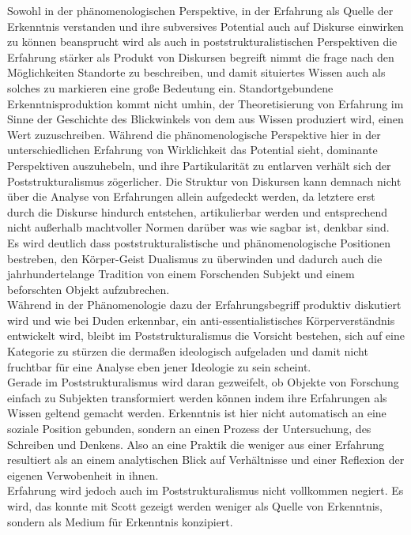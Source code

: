 Sowohl in der phänomenologischen Perspektive, in der Erfahrung als Quelle der
Erkenntnis verstanden und ihre subversives Potential auch auf Diskurse
einwirken zu können beansprucht wird \footnotemark {} als auch in poststrukturalistischen
Perspektiven die Erfahrung stärker als Produkt von Diskursen begreift
\footnotemark {} nimmt
die frage nach den Möglichkeiten Standorte zu beschreiben, und damit situiertes
Wissen auch als solches zu markieren eine große Bedeutung ein.
Standortgebundene Erkenntnisproduktion kommt nicht umhin, der Theoretisierung
von Erfahrung im Sinne der Geschichte des Blickwinkels von dem aus Wissen
produziert wird, einen Wert zuzuschreiben. Während die phänomenologische
Perspektive hier in der unterschiedlichen Erfahrung von Wirklichkeit das
Potential sieht, dominante Perspektiven auszuhebeln, und ihre Partikularität
zu entlarven verhält sich der Poststrukturalismus zögerlicher. Die Struktur von
Diskursen kann demnach nicht über die Analyse von Erfahrungen allein aufgedeckt
werden, da letztere erst durch die Diskurse hindurch entstehen, artikulierbar
werden und entsprechend nicht außerhalb machtvoller Normen darüber was wie
sagbar ist, denkbar sind.
\\

Es wird deutlich dass poststrukturalistische und phänomenologische Positionen
bestreben, den Körper-Geist Dualismus zu überwinden und dadurch auch die
jahrhundertelange Tradition von einem Forschenden Subjekt und einem beforschten
Objekt aufzubrechen. \\
Während in der Phänomenologie dazu der Erfahrungsbegriff
produktiv diskutiert wird und wie bei Duden erkennbar, ein
anti-essentialistisches Körperverständnis entwickelt wird, bleibt im
Poststrukturalismus die Vorsicht bestehen, sich auf eine Kategorie zu stürzen
die dermaßen ideologisch aufgeladen und damit nicht fruchtbar für eine Analyse
eben jener Ideologie zu sein scheint. \\
Gerade im Poststrukturalismus wird daran
gezweifelt, ob Objekte von Forschung einfach zu Subjekten transformiert werden
können indem ihre Erfahrungen als Wissen geltend gemacht werden. Erkenntnis ist
hier nicht automatisch an eine soziale Position gebunden, sondern an einen
Prozess der Untersuchung, des Schreiben und Denkens. Also an eine Praktik die
weniger aus einer Erfahrung resultiert als an einem analytischen Blick auf
Verhältnisse und einer Reflexion der eigenen Verwobenheit in ihnen. \\
Erfahrung
wird jedoch auch im Poststrukturalismus nicht vollkommen negiert. Es wird, das
konnte mit Scott gezeigt werden weniger als Quelle von Erkenntnis, sondern als
Medium für Erkenntnis konzipiert.
\\

